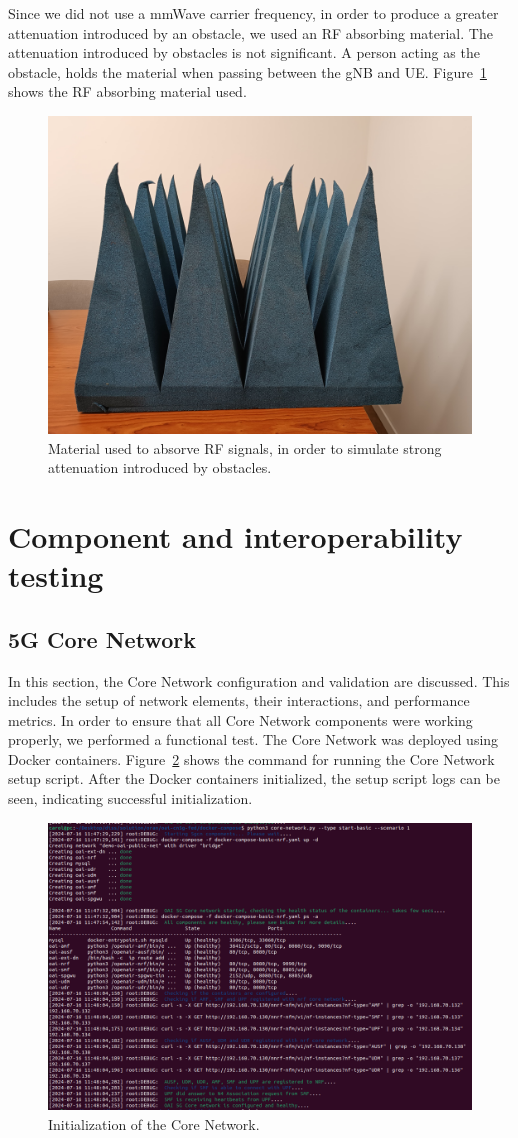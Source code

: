 Since we did not use a mmWave carrier frequency, in order to produce a greater attenuation introduced by an obstacle, we used an RF absorbing material.
The attenuation introduced by obstacles is not significant.
A person acting as the obstacle, holds the material when passing between the gNB and UE\@.
Figure~\ref{fig:foam} shows the RF absorbing material used.

\begin{figure}[H]
    \centering
    \includegraphics[width=0.5\linewidth]{figures/foam}
    \caption{Material used to absorve RF signals, in order to simulate strong attenuation introduced by obstacles.}
    \label{fig:foam}
\end{figure}



\section{Component and interoperability testing}\label{sec:component-testing}


\subsection{5G Core Network}\label{subsec:core_network}
In this section, the Core Network configuration and validation are discussed.
This includes the setup of network elements, their interactions, and performance metrics.
In order to ensure that all Core Network components were working properly, we performed a functional test.
The Core Network was deployed using Docker containers.
Figure~\ref{fig:core_init} shows the command for running the Core Network setup script.
After the Docker containers initialized, the setup script logs can be seen, indicating successful initialization.

\begin{figure}[H]
    \centering
    \includegraphics[width=0.7\linewidth]{figures/core_init}
    \caption[Initialization of the Core Network]{Initialization of the Core Network.}
    \label{fig:core_init}
\end{figure}

